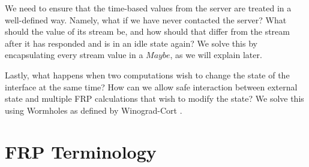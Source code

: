\documentclass[twocolumn,11pt,english]{article}
\begin{document}
We need to ensure that the time-based values from the server are treated in a well-defined way. Namely, what if we have never contacted the server? What should the value of its stream be, and how should that differ from the stream after it has responded and is in an idle state again? We solve this by encapsulating every stream value in a $Maybe$, as we will explain later. 

Lastly, what happens when two computations wish to change the state of the interface at the same time? How can we allow safe interaction between external state and multiple FRP calculations that wish to modify the state? We solve this using Wormholes as defined by Winograd-Cort \cite{WinogradCort2012HS}.

\section{FRP Terminology}
\end{document}
